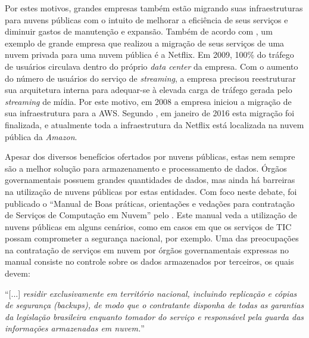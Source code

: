 Por estes motivos, grandes empresas também estão migrando suas infraestruturas para nuvens públicas com o intuito de melhorar a eficiência de seus serviços e diminuir gastos de manutenção e expansão. Também de acordo com , um exemplo de grande empresa que realizou a migração de seus serviços de uma nuvem privada para uma nuvem pública é a Netflix. Em 2009, 100\% do tráfego de usuários circulava dentro do próprio \textit{data center} da empresa. Com o aumento do número de usuários do serviço de \textit{streaming}, a empresa precisou reestruturar sua arquitetura interna para adequar-se à elevada carga de tráfego gerada pelo \textit{streaming} de mídia. Por este motivo, em 2008 a empresa iniciou a migração de sua infraestrutura para a \ac{AWS}. Segundo , em janeiro de 2016 esta migração foi finalizada, e atualmente toda a infraestrutura da Netflix está localizada na nuvem pública da \textit{Amazon}.

Apesar dos diversos benefícios ofertados por nuvens públicas, estas nem sempre são a melhor solução para armazenamento e processamento de dados. Órgãos governamentais possuem grandes quantidades de dados, mas ainda há barreiras na utilização de nuvens públicas por estas entidades. Com foco neste debate, foi publicado o ``Manual de Boas práticas, orientações e vedações para contratação de Serviços de Computação em Nuvem'' pelo . Este manual veda a utilização de nuvens públicas em alguns cenários, como em casos em que os serviços de \ac{TIC} possam comprometer a segurança nacional, por exemplo. Uma das preocupações na contratação de serviços em nuvem por órgãos governamentais expressas no manual consiste no controle sobre os dados armazenados por terceiros, os quais devem:

\begin{citacao}
``[...] \textit{residir exclusivamente em território nacional, incluindo replicação e cópias de segurança (\textit{backups}), de modo que o contratante disponha de todas as garantias da legislação brasileira enquanto tomador do serviço e responsável
pela guarda das informações armazenadas em nuvem.}'' \cite{boaspraticas}
\end{citacao}

